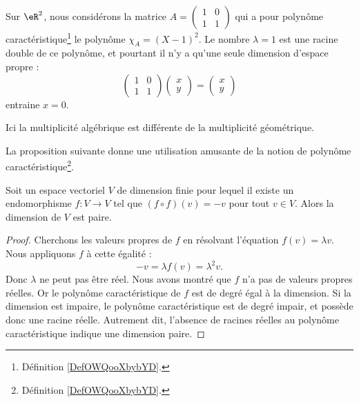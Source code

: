 \begin{example} \label{ExICOJcFp}
    Sur \( \eR^2\), nous considérons la matrice \( A=\begin{pmatrix}
        1    &   0    \\ 
        1    &   1    
    \end{pmatrix}\) qui a pour polynôme caractéristique\footnote{Définition \ref{DefOWQooXbybYD}.} le polynôme \( \chi_A=(X-1)^2\). Le nombre \( \lambda=1\) est une racine double de ce polynôme, et pourtant il n'y a qu'une seule dimension d'espace propre :
    \begin{equation}
        \begin{pmatrix}
            1    &   0    \\ 
            1    &   1    
        \end{pmatrix}\begin{pmatrix}
            x    \\ 
            y    
        \end{pmatrix}=\begin{pmatrix}
            x    \\ 
            y    
        \end{pmatrix}
    \end{equation}
    entraine \( x=0\).

    Ici la multiplicité algébrique est différente de la multiplicité géométrique.
\end{example}

La proposition suivante donne une utilisation amusante de la notion de polynôme caractéristique\footnote{Définition \ref{DefOWQooXbybYD}.}.
\begin{proposition}
    Soit un espace vectoriel \( V\) de dimension finie pour lequel il existe un endomorphisme \( f\colon V\to V\) tel que \( (f\circ f)(v)=-v\) pour tout \( v\in V\). Alors la dimension de \( V\) est paire.
\end{proposition}

\begin{proof}
    Cherchons les valeurs propres de \( f\) en résolvant l'équation \( f(v)=\lambda v\). Nous appliquons \( f\) à cette égalité :
    \begin{equation}
        -v=\lambda f(v)=\lambda^2v.
    \end{equation}
    Donc \( \lambda\) ne peut pas être réel. Nous avons montré que \( f\) n'a pas de valeurs propres réelles. Or le polynôme caractéristique de \( f\) est de degré égal à la dimension. Si la dimension est impaire, le polynôme caractéristique est de degré impair, et possède donc une racine réelle. Autrement dit, l'absence de racines réelles au polynôme caractéristique indique une dimension paire.
\end{proof}


